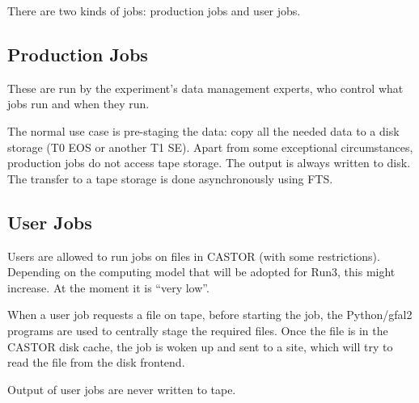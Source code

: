 \documentclass{lhcb+cta}
\begin{document}
There are two kinds of jobs: production jobs and user jobs.

\subsection*{Production Jobs}

These are run by the experiment's data management experts, who control what jobs run and when they run.

The normal use case is pre-staging the data: copy all the needed data to a disk storage (T0 EOS or another T1 SE). Apart from some exceptional circumstances, production jobs do not access tape storage. The output is always written to disk. The transfer to a tape storage is done asynchronously using FTS.

\subsection*{User Jobs}

Users are allowed to run jobs on files in CASTOR (with some restrictions). Depending on the computing model that will be adopted for Run3, this might increase. At the moment it is ``very low''.

When a user job requests a file on tape, before starting the job, the Python/gfal2 programs are used to centrally stage the required files. Once the file is in the CASTOR disk cache, the job is woken up and sent to a site, which will try to read the file from the disk frontend.

Output of user jobs are never written to tape.
\end{document}
